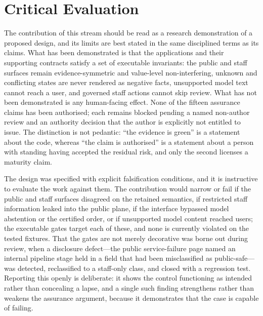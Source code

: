 \section{Critical Evaluation}
\label{ch:eval}
The contribution of this stream should be read as a research demonstration of a proposed design, and
its limits are best stated in the same disciplined terms as its claims. What has been demonstrated is
that the applications and their supporting contracts satisfy a set of executable invariants: the public
and staff surfaces remain evidence-symmetric and value-level non-interfering, unknown and conflicting
states are never rendered as negative facts, unsupported model text cannot reach a user, and governed
staff actions cannot skip review. What has not been demonstrated is any human-facing effect. None of the
fifteen assurance claims has been authorised; each remains blocked pending a named non-author review and
an authority decision that the author is explicitly not entitled to issue. The distinction is not
pedantic: ``the evidence is green'' is a statement about the code, whereas ``the claim is authorised''
is a statement about a person with standing having accepted the residual risk, and only the second
licenses a maturity claim.

The design was specified with explicit falsification conditions, and it is instructive to evaluate the
work against them. The contribution would narrow or fail if the public and staff surfaces disagreed on
the retained semantics, if restricted staff information leaked into the public plane, if the interface
bypassed model abstention or the certified order, or if unsupported model content reached users; the
executable gates target each of these, and none is currently violated on the tested fixtures. That the
gates are not merely decorative was borne out during review, when a disclosure defect---the public
service-failure page named an internal pipeline stage held in a field that had been misclassified as
public-safe---was detected, reclassified to a staff-only class, and closed with a regression test.
Reporting this openly is deliberate: it shows the control functioning as intended rather than concealing
a lapse, and a single such finding strengthens rather than weakens the assurance argument, because it
demonstrates that the case is capable of failing.

